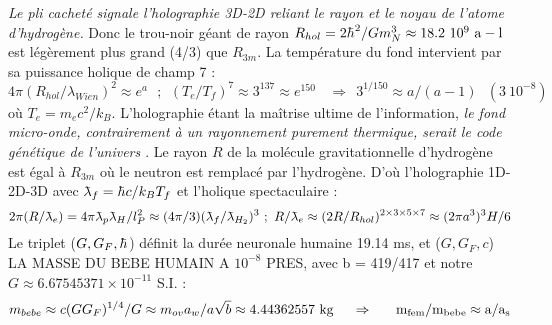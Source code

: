 \documentclass[a4paper,12pt]{article}
\renewcommand{\hbar}{{\mkern0.75mu\mathchar '26\mkern -9.75mu h}}
\newcommand{\lambdabar}{{\mkern0.75mu\mathchar '26\mkern -9.75mu\lambda}}
\begin{document}
\textit{Le pli cacheté signale l'holographie 3D-2D reliant le rayon et le noyau de l'atome d'hydrogène.} Donc le trou-noir géant de rayon $R_{hol} = 2\hbar^2/Gm_N^3 \approx 18.2 ~10^9~ \rm{a-l}$ est légèrement plus grand (4/3) que $R_{3m}$. La  température du fond intervient par sa puissance holique de champ 7 :
\begin{equation}
    4\pi (R_{hol}/\lambda_{Wien} )^2\approx e^a ~~~;~~(T_e/T_{f})^7 \approx 3^{137}\approx e^{150} ~~~~\Rightarrow~~ 3^{1/150}\approx a/(a-1)~~~(3~10^{-8}) 
\end{equation}
 où $T_e = m_ec^2/k_B$. L'holographie étant la maîtrise ultime de l'information, \textit{le fond micro-onde, contrairement à un rayonnement purement thermique, serait le code génétique de l'univers \citep{giertych}}. 
Le rayon $R$ de la molécule gravitationnelle d'hydrogène est égal à $R_{3m}$ où le neutron est remplacé par l'hydrogène. D'où l'holographie 1D-2D-3D avec $\lambdabar_{f}= \hbar c/k_B T_f$ et l'holique spectaculaire :
\begin{equation}
    2\pi (R/\lambdabar_{e} ) = 4\pi \lambdabar_p \lambdabar_H/l_P^2 \approx (4\pi/3) (\lambdabar_{f} / \lambdabar_{H_2} )^3 ~;~R/\lambdabar_{e} \approx (2R/R_{{hol}} )^{2\times3\times 5\times 7} \approx (2\pi a^3)^3 H/6
\end{equation}
 Le triplet ($G,G_F,\hbar$) définit la durée neuronale humaine 19.14 ms, et ($G,G_F,c$) LA MASSE DU BEBE HUMAIN A $10^{-8}$ PRES, avec b = 419/417 et notre $G \approx 6.67545371 \times 10^{-11}$ S.I.  \citep{sanchez_2024}  :
 \begin{equation}
m_{bebe} \approx c(G G_F)^{1/4}/G \approx m_{ov} a_w / a \sqrt b \approx 4.44362557 ~\rm{kg}~~~~\Rightarrow~~~~~m_{fem} /m_{bebe}  \approx a/a_s
\end{equation} 

 
\end{document}
